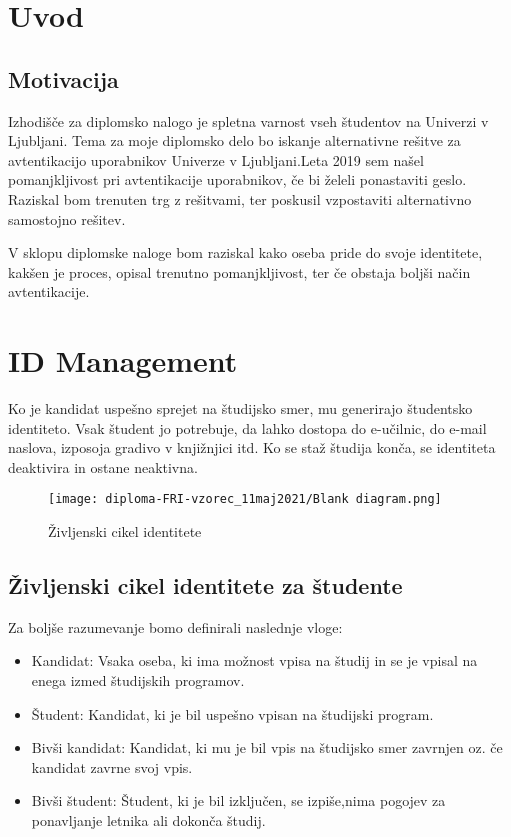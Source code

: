 \documentclass[a4paper,12pt,openright]{book}
\begin{document}
\chapter{Uvod}

\section{Motivacija}
Izhodišče za diplomsko nalogo je spletna varnost vseh študentov na Univerzi v Ljubljani. Tema za moje diplomsko delo bo iskanje alternativne rešitve za avtentikacijo uporabnikov Univerze v Ljubljani.Leta 2019 sem našel pomanjkljivost pri avtentikacije uporabnikov, če bi želeli ponastaviti geslo. Raziskal bom trenuten trg z rešitvami, ter poskusil vzpostaviti alternativno samostojno rešitev. \newline

V sklopu diplomske naloge bom raziskal kako oseba pride do svoje identitete, kakšen je proces, opisal trenutno pomanjkljivost, ter če obstaja boljši način avtentikacije.

\chapter{ID Management}

Ko je kandidat uspešno sprejet na študijsko smer, mu generirajo študentsko identiteto. Vsak študent jo potrebuje, da lahko dostopa do e-učilnic, do e-mail naslova, izposoja gradivo v knjižnjici itd. \newline
Ko se staž študija konča, se identiteta deaktivira in ostane neaktivna.

\begin{figure}[]
\texttt{[image: diploma-FRI-vzorec\_11maj2021/Blank diagram.png]}
\caption{Življenski cikel identitete}
\label{fig:IDlife}
\end{figure}


\section{Življenski cikel identitete za študente}

Za boljše razumevanje bomo definirali naslednje vloge:
\begin{itemize}
    \item Kandidat: Vsaka oseba, ki ima možnost vpisa na študij in se je vpisal na enega izmed študijskih programov.
    \item Študent: Kandidat, ki je bil uspešno vpisan na študijski program. 
    \item Bivši kandidat: Kandidat, ki mu je bil vpis na študijsko smer zavrnjen oz. če kandidat zavrne svoj vpis.
    \item Bivši študent: Študent, ki je bil izključen, se izpiše,nima pogojev za ponavljanje letnika ali dokonča študij.
    
\end{itemize}
\end{document}
